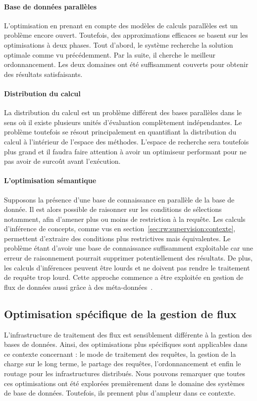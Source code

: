 \paragraph*{Base de données parallèles}
L'optimisation en prenant en compte des modèles de calculs parallèles est un problème encore ouvert. Toutefois, des approximations efficaces se basent sur les optimisations à deux phases. Tout d'abord, le système recherche la solution optimale comme vu précédemment. Par la suite, il cherche le meilleur ordonnancement. Les deux domaines ont été suffisamment couverts pour obtenir des résultats satisfaisants.

\paragraph*{Distribution du calcul}
La distribution du calcul est un problème différent des bases parallèles dans le sens où il existe plusieurs unités d'évaluation complètement indépendantes. Le problème toutefois se résout principalement en quantifiant la distribution du calcul à l'intérieur de l'espace des méthodes. L'espace de recherche sera toutefois plus grand et il faudra faire attention à avoir un optimiseur performant pour ne pas avoir de surcoût avant l'exécution.

\paragraph*{L'optimisation sémantique}
Supposons la présence d'une base de connaissance en parallèle de la base de donnée. Il est alors possible de raisonner sur les conditions de sélections notamment, afin d'amener plus ou moins de restriction à la requête. Les calculs d'inférence de concepts, comme vus en section~\ref{sec:rw:supervision:contexte}, permettent d'extraire des conditions plus restrictives mais équivalentes. Le problème étant d'avoir une base de connaissance suffisamment exploitable car une erreur de raisonnement pourrait supprimer potentiellement des résultats. De plus, les calculs d'inférences peuvent être lourds et ne doivent pas rendre le traitement de requête trop lourd. Cette approche commence a être exploitée en gestion de flux de données aussi grâce à des méta-données~\cite{Ding:semantic}.

\subsection{Optimisation spécifique de la gestion de flux}\label{sec:rw:sgfd:optimisation:flux}
L'infrastructure de traitement des flux est sensiblement différente à la gestion des bases de données. Ainsi, des optimisations plus spécifiques sont applicables dans ce contexte concernant : le mode de traitement des requêtes, la gestion de la charge sur le long terme, le partage des requêtes, l'ordonnancement et enfin le routage pour les infrastructures distribués. Nous pouvons remarquer que toutes ces optimisations ont été explorées premièrement dans le domaine des systèmes de base de données. Toutefois, ils prennent plus d'ampleur dans ce contexte.

